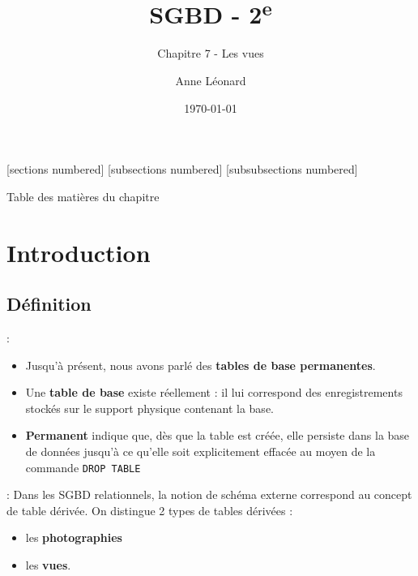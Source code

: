 \documentclass[10pt]{beamer}
\title{SGBD - 2\textsuperscript{e}}
\subtitle{Chapitre 7 - Les vues}
\date{\today}
\author{Anne Léonard}
\institute{Haute École de la Province de Liège}
\begin{document}
\maketitle

[sections numbered]
[subsections numbered]
[subsubsections numbered]
\begin{frame}[allowframebreaks]{Table des matières du chapitre}
    \tableofcontents[subsectionstyle=show/show/hide,subsubsectionstyle=show/show/hide,]
\end{frame}

\section{Introduction}
\tocss
\subsection{Définition}
\begin{frame}{\secname : \subsecname}
    \begin{itemize}
        \item Jusqu'à présent, nous avons parlé des \textbf{tables de base permanentes}.
        \item Une \textbf{table de base} existe réellement : il lui correspond des enregistrements stockés sur le support physique contenant la base.
        \item \textbf{Permanent} indique que, dès que la table est créée, elle persiste dans la base de données jusqu'à ce qu'elle soit explicitement effacée au moyen de la commande \lstinline[language=plsql]!DROP TABLE!
    \end{itemize}
\end{frame}

\begin{frame}{\secname : \subsecname}
    Dans les SGBD relationnels, la notion de schéma externe correspond au concept de table dérivée.  On distingue 2 types de tables dérivées :
    \begin{itemize}
        \item les \textbf{photographies}
        \item les \textbf{vues}.
    \end{itemize}
\end{frame}
\end{document}
